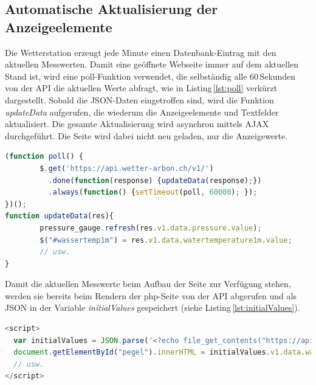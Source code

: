 \subsection{Automatische Aktualisierung der Anzeigeelemente}
Die Wetterstation erzeugt jede Minute einen Datenbank-Eintrag mit den aktuellen Messwerten. Damit eine geöffnete Webseite immer auf dem aktuellen Stand ist, wird eine poll-Funktion verwendet, die selbständig alle 60\,Sekunden von der API die aktuellen Werte abfragt, wie in Listing\,\ref{lst:poll} verkürzt dargestellt. Sobald die JSON-Daten eingetroffen sind, wird die Funktion \emph{updateData} aufgerufen, die wiederum die Anzeigeelemente und Textfelder aktualisiert. Die gesamte Aktualisierung wird asynchron mittels AJAX durchgeführt. Die Seite wird dabei nicht neu geladen, nur die Anzeigewerte.

\begin{lstlisting}[label=lst:poll,caption=Automatische Aktualisierung der Werte, language=JavaScript, style=htmlcssjs]
(function poll() {
        $.get('https://api.wetter-arbon.ch/v1/')
          .done(function(response) {updateData(response);})
          .always(function() {setTimeout(poll, 60000); });
})();
function updateData(res){
        pressure_gauge.refresh(res.v1.data.pressure.value);
        $("#wassertemp1m") = res.v1.data.watertemperature1m.value;
        // usw.
}
\end{lstlisting}

\noindent
Damit die aktuellen Messwerte beim Aufbau der Seite zur Verfügung stehen, werden sie bereits beim Rendern der php-Seite von der API abgerufen und als JSON in der Variable \emph{initialValues} gespeichert (siehe Listing\,\ref{lst:initialValues}).

\begin{lstlisting}[label=lst:initialValues,caption=Übergabe der Initialisierungswerte durch php, language=JavaScript, style=htmlcssjs]
<script>
  var initialValues = JSON.parse('<?echo file_get_contents("https://api.wetter-arbon.ch/v1/");?>');
  document.getElementById("pegel").innerHTML = initialValues.v1.data.waterlevel.value;
  // usw.
</script>

\end{lstlisting}

